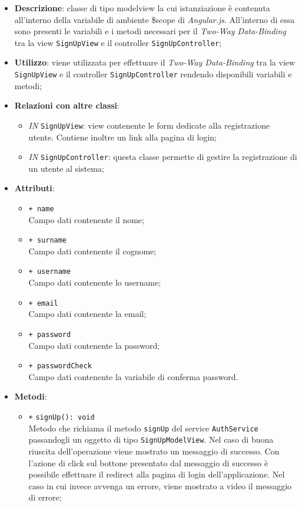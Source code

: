 	\begin{itemize}
		\item \textbf{Descrizione}: classe di tipo modelview la cui istanziazione è contenuta all'interno della variabile di ambiente \$scope di \textit{Angular.js}. All'interno di essa sono presenti le variabili e i metodi necessari per il \textit{Two-Way Data-Binding} tra la view \texttt{SignUpView} e il controller \texttt{SignUpController};
		\item \textbf{Utilizzo}: viene utilizzata per effettuare il \textit{Two-Way Data-Binding} tra la view \texttt{SignUpView} e il controller \texttt{SignUpController} rendendo disponibili variabili e metodi;
		\item \textbf{Relazioni con altre classi}: 
		\begin{itemize}
			\item \textit{IN} \texttt{SignUpView}: view contenente le form dedicate alla registrazione utente. Contiene inoltre un link alla pagina di login; 
			\item \textit{IN} \texttt{SignUpController}: questa classe permette di gestire la registrazione di un utente al sistema;
		\end{itemize}
		\item \textbf{Attributi}: 
		\begin{itemize}
			\item \texttt{+ name} \\ Campo dati contenente il nome;
			\item \texttt{+ surname} \\ Campo dati contenente il cognome;
			\item \texttt{+ username} \\ Campo dati contenente lo username;
			\item \texttt{+ email} \\ Campo dati contenente la email;
			\item \texttt{+ password} \\ Campo dati contenente la password;
			\item \texttt{+ passwordCheck} \\ Campo dati contenente la variabile di conferma password.
		\end{itemize}
		\item \textbf{Metodi}: 
		\begin{itemize}
			\item \texttt{+} \texttt{signUp(): void} \\
			Metodo che richiama il metodo \texttt{signUp} del service \texttt{AuthService} passandogli un oggetto di tipo \texttt{SignUpModelView}. Nel caso di buona riuscita dell'operazione viene mostrato un messaggio di successo. Con l'azione di click sul bottone presentato dal messaggio di successo è possibile effettuare il redirect alla pagina di login dell'applicazione. Nel caso in cui invece avvenga un errore, viene mostrato a video il messaggio di errore;

\end{itemize}
\end{itemize}
